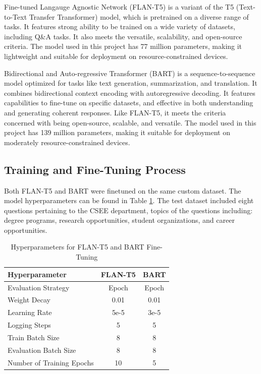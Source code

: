 \documentclass[conference]{IEEEtran}
\begin{document}
Fine-tuned Langauge Agnostic Network (FLAN-T5) is a variant of the T5 (Text-to-Text Transfer Transformer) model, which is pretrained on a diverse range of tasks. 
It features strong ability to be trained on a wide variety of datasets, including Q\&A tasks. 
It also meets the versatile, scalability, and open-source criteria. 
The model used in this project has 77 million parameters, making it lightweight and suitable for deployment on resource-constrained devices.

Bidirectional and Auto-regressive Transformer (BART) is a sequence-to-sequence model optimized for tasks like text generation, summarization, and translation. 
It combines bidirectional context encoding with autoregressive decoding. 
It features capabilities to fine-tune on specific datasets, and effective in both understanding and generating coherent responses.
Like FLAN-T5, it meets the criteria concerned with being open-source, scalable, and versatile. 
The model used in this project has 139 million parameters, making it suitable for deployment on moderately resource-constrained devices.

\subsection{Training and Fine-Tuning Process} 
Both FLAN-T5 and BART were finetuned on the same custom dataset. The model hyperparameters can be found in Table \ref{tab:hyperparams}.
The test dataset included eight questions pertaining to the CSEE department, topics of the questions including: degree programs, research opportunities, student organizations, and career opportunities. 

\begin{table}[!ht]
    \centering
    \caption{Hyperparameters for FLAN-T5 and BART Fine-Tuning}
    \label{tab:hyperparams}
    \begin{tabular}{l|c|c}
        \toprule
        \textbf{Hyperparameter}         & \textbf{FLAN-T5}         & \textbf{BART} \\
        \midrule
        Evaluation Strategy             & Epoch                   & Epoch                     \\ 
        Weight Decay                    & 0.01                    & 0.01                      \\ 
        Learning Rate                   & 5e-5                    & 3e-5                      \\ 
        Logging Steps                   & 5                       & 5                         \\ 
        Train Batch Size                & 8                       & 8                         \\ 
        Evaluation Batch Size           & 8                       & 8                         \\ 
        Number of Training Epochs       & 10                      & 5                         \\ 
        \bottomrule
    \end{tabular}
\end{table}
\end{document}
